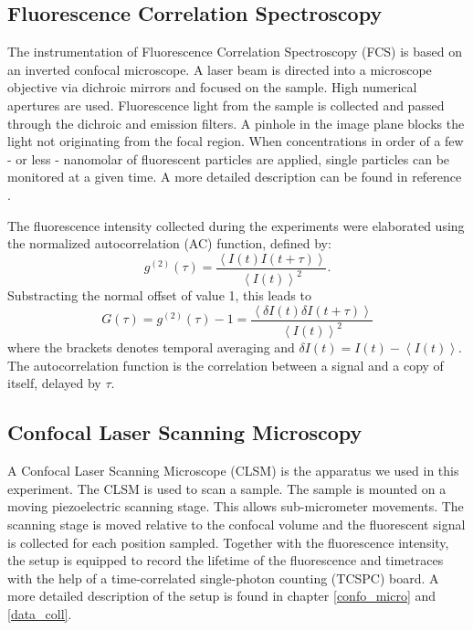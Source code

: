 \documentclass[twoside,single]{lion-msc}
\begin{document}
\subsection{Fluorescence Correlation Spectroscopy}
The instrumentation of Fluorescence Correlation Spectroscopy (FCS) is based on an inverted confocal microscope.  A laser beam is directed into a microscope objective via dichroic mirrors and focused on the sample. High numerical apertures are used. Fluorescence light from the sample is collected and passed through the dichroic and emission filters. A pinhole in the image plane blocks the light not originating from the focal region. When concentrations in order of a few - or less - nanomolar of fluorescent particles are applied, single particles can be monitored at a given time. A more detailed description can be found in reference \cite{Schwille}.

The fluorescence intensity collected during the experiments were elaborated using the normalized autocorrelation (AC) function, defined by:
\begin{equation}
g^{(2)}(\tau) = \frac{\left \langle I(t)I(t + \tau) \right \rangle}{\left \langle I(t)\right \rangle ^{2}}.
\end{equation}
Substracting the normal offset of value 1, this leads to
\begin{equation} \label{AC}
G(\tau) = g^{(2)}(\tau) - 1 =  \frac{\left \langle \delta I(t)\delta I(t + \tau) \right \rangle}{\left \langle I(t)\right \rangle ^{2}}
\end{equation}
where the brackets  denotes temporal averaging and $\delta I(t) = I(t) - \left \langle I(t)\right \rangle$. The autocorrelation function is the correlation between a signal and a copy of itself,  delayed by $\tau$.

\subsection{Confocal Laser Scanning Microscopy}
A Confocal Laser Scanning Microscope (CLSM) is the apparatus we used in this experiment. The CLSM is used to scan a sample. The sample is mounted on a moving piezoelectric scanning stage. This allows sub-micrometer movements. The scanning stage is moved relative to the confocal volume and the fluorescent signal is collected for each position sampled. Together with the fluorescence intensity, the setup is equipped to record the lifetime of the fluorescence and timetraces with the help of a time-correlated single-photon counting (TCSPC) board. A more detailed description of the setup is found in chapter \ref{confo_micro} and \ref{data_coll}.
\end{document}
